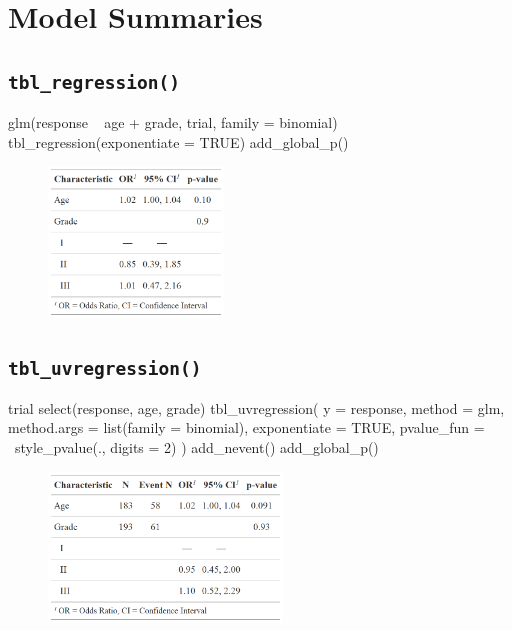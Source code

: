 

\section{Model Summaries}

\subsection{\texorpdfstring{\texttt{tbl\_regression()}}{tbl\_regression()}}

\begin{example}
glm(response ~ age + grade, trial, family = binomial) %
  tbl_regression(exponentiate = TRUE) %
  add_global_p()
\end{example}

\begin{figure}[h!]
  \includegraphics[height=4cm]{regression.png}
  \centering
\end{figure}

\subsection{\texorpdfstring{\texttt{tbl\_uvregression()}}{tbl\_uvregression()}}
\begin{example}
trial %
  select(response, age, grade) %
  tbl_uvregression(
    y = response, 
    method = glm,
    method.args = list(family = binomial),
    exponentiate = TRUE,
    pvalue_fun = ~style_pvalue(., digits = 2)
  ) %
  add_nevent() %
  add_global_p()
\end{example}

\begin{figure}[h!]
  \includegraphics[height=4cm]{uvregression.png}
  \centering
\end{figure}

